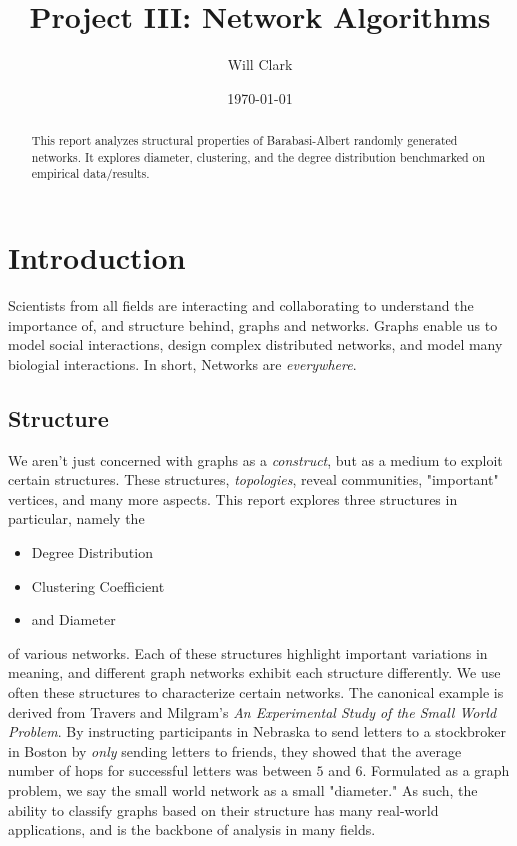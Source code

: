 \documentclass[11pt]{article}
\title{\textbf{Project III: Network Algorithms}}
\author{Will Clark}
\date{\today}
\begin{document}
\maketitle

\begin{abstract}
	This report analyzes structural properties of Barabasi-Albert randomly generated
    networks. It explores diameter, clustering, and the degree distribution 
    benchmarked on empirical data/results.
\end{abstract}

\section{Introduction}
Scientists from all fields are interacting and collaborating to understand the 
importance of, and structure behind, graphs and networks. Graphs enable us to model 
social interactions, design complex distributed networks, and model many biologial 
interactions. In short, Networks are \textit{everywhere}. 

\subsection{Structure}
We aren't just concerned with graphs as a \textit{construct}, but as a medium to 
exploit certain structures. These structures, \textit{topologies}, reveal 
communities, "important" vertices, and many more aspects. This report
explores three structures in particular, namely the
\begin{itemize}[$\diamond$]
	\item Degree Distribution
	\item Clustering Coefficient
	\item and Diameter
\end{itemize}
of various networks. Each of these structures highlight important variations in
meaning, and different graph networks exhibit each structure differently. 
We use often these structures to characterize certain networks. The canonical example
is derived from Travers and Milgram's \textit{An Experimental Study of the Small 
World Problem}. By instructing participants in Nebraska to send letters to a 
stockbroker in Boston by \textit{only} sending letters to friends, they showed 
that the average number of hops for successful letters was between $5$ and $6$. 
Formulated as a graph problem, we say the small world network as a small "diameter."
As such, the ability to classify graphs based on their structure has many real-world
applications, and is the backbone of analysis in many fields.  
\end{document}
